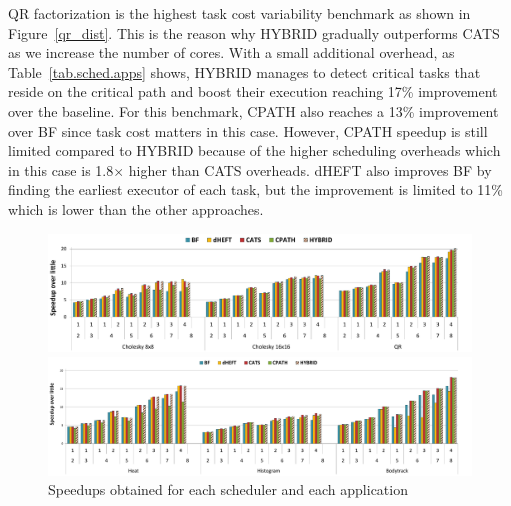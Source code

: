 
QR factorization is the highest task cost variability benchmark as shown in Figure~\ref{qr_dist}.
This is the reason why HYBRID gradually outperforms CATS as we increase the number of cores.
With a small additional overhead,
as Table~\ref{tab.sched.apps} shows, HYBRID manages to detect critical tasks that reside on the critical path and boost their execution reaching 17\% improvement over the baseline.
For this benchmark, CPATH also reaches a 13\% improvement over BF since task cost matters in this case. 
However, CPATH speedup is still limited compared to HYBRID because of the higher scheduling overheads which in this case is 1.8$\times$ higher than CATS overheads.
dHEFT also improves BF by finding the earliest executor of each task, but the improvement is limited to 11\% which is lower than the other approaches.
\begin{figure}[!t]
	\includegraphics[width=\textwidth]{figures/speedup_apps1.pdf}
	\vspace{-0.4cm}
	
	\includegraphics[width=\textwidth]{figures/speedup_apps2.pdf}
	\caption{Speedups obtained for each scheduler and each application}
	\label{speedup}
	\vspace{-0.4cm}
\end{figure}  


